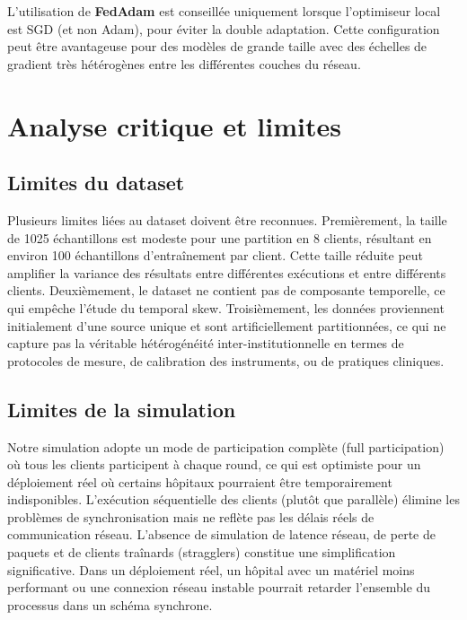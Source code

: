 \documentclass[12pt,a4paper]{report}
\begin{document}
L'utilisation de \textbf{FedAdam} est conseill\'{e}e uniquement lorsque l'optimiseur local est SGD (et non Adam), pour \'{e}viter la double adaptation. Cette configuration peut \^{e}tre avantageuse pour des mod\`{e}les de grande taille avec des \'{e}chelles de gradient tr\`{e}s h\'{e}t\'{e}rog\`{e}nes entre les diff\'{e}rentes couches du r\'{e}seau.

\section{Analyse critique et limites}

\subsection{Limites du dataset}

Plusieurs limites li\'{e}es au dataset doivent \^{e}tre reconnues. Premi\`{e}rement, la taille de 1025 \'{e}chantillons est modeste pour une partition en 8 clients, r\'{e}sultant en environ 100 \'{e}chantillons d'entra\^{i}nement par client. Cette taille r\'{e}duite peut amplifier la variance des r\'{e}sultats entre diff\'{e}rentes ex\'{e}cutions et entre diff\'{e}rents clients. Deuxi\`{e}mement, le dataset ne contient pas de composante temporelle, ce qui emp\^{e}che l'\'{e}tude du temporal skew. Troisi\`{e}mement, les donn\'{e}es proviennent initialement d'une source unique et sont artificiellement partitionn\'{e}es, ce qui ne capture pas la v\'{e}ritable h\'{e}t\'{e}rog\'{e}n\'{e}it\'{e} inter-institutionnelle en termes de protocoles de mesure, de calibration des instruments, ou de pratiques cliniques.

\subsection{Limites de la simulation}

Notre simulation adopte un mode de participation compl\`{e}te (full participation) o\`{u} tous les clients participent \`{a} chaque round, ce qui est optimiste pour un d\'{e}ploiement r\'{e}el o\`{u} certains h\^{o}pitaux pourraient \^{e}tre temporairement indisponibles. L'ex\'{e}cution s\'{e}quentielle des clients (plut\^{o}t que parall\`{e}le) \'{e}limine les probl\`{e}mes de synchronisation mais ne refl\`{e}te pas les d\'{e}lais r\'{e}els de communication r\'{e}seau. L'absence de simulation de latence r\'{e}seau, de perte de paquets et de clients \og{}tra\^{i}nards\fg{} (stragglers) constitue une simplification significative. Dans un d\'{e}ploiement r\'{e}el, un h\^{o}pital avec un mat\'{e}riel moins performant ou une connexion r\'{e}seau instable pourrait retarder l'ensemble du processus dans un sch\'{e}ma synchrone.
\end{document}
